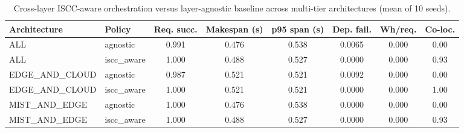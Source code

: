 \begin{table}
\centering
\small
\caption{Cross-layer ISCC-aware orchestration versus layer-agnostic baseline across multi-tier architectures (mean of 10 seeds).}
\label{tab:p5-main}
\begin{tabular}{llcccccc}
\toprule
Architecture & Policy & Req. succ. & Makespan (s) & p95 span (s) & Dep. fail. & Wh/req. & Co-loc. \\
\midrule
ALL & agnostic & 0.991 & 0.476 & 0.538 & 0.0065 & 0.000 & 0.00 \\
ALL & iscc\_aware & 1.000 & 0.488 & 0.527 & 0.0000 & 0.000 & 0.93 \\
EDGE\_AND\_CLOUD & agnostic & 0.987 & 0.521 & 0.521 & 0.0092 & 0.000 & 0.00 \\
EDGE\_AND\_CLOUD & iscc\_aware & 1.000 & 0.521 & 0.521 & 0.0000 & 0.000 & 1.00 \\
MIST\_AND\_EDGE & agnostic & 1.000 & 0.476 & 0.538 & 0.0000 & 0.000 & 0.00 \\
MIST\_AND\_EDGE & iscc\_aware & 1.000 & 0.488 & 0.527 & 0.0000 & 0.000 & 0.93 \\
\bottomrule
\end{tabular}
\par\vspace{2pt}{\footnotesize\raggedright Req. succ. = fraction of 4-stage ISCC pipelines completing all stages within 0.80 s; Co-loc. = fraction of dependent stages co-located.\par}
\end{table}
